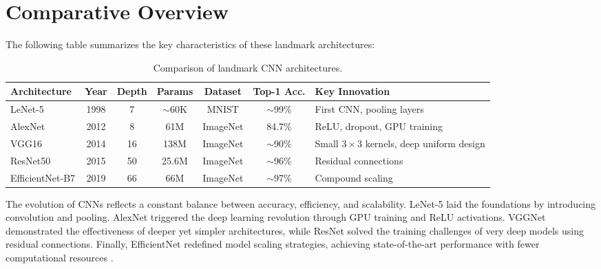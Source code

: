 \section{Comparative Overview}

The following table summarizes the key characteristics of these landmark architectures:

\begin{table}[H]
\centering
\begin{tabular}{lcccccl}
\hline
\textbf{Architecture} & \textbf{Year} & \textbf{Depth} & \textbf{Params} & \textbf{Dataset} & \textbf{Top-1 Acc.} & \textbf{Key Innovation} \\
\hline
LeNet-5 & 1998 & 7  & $\sim$60K  & MNIST    & $\sim$99\%  & First CNN, pooling layers \\
AlexNet & 2012 & 8  & 61M        & ImageNet & 84.7\%      & ReLU, dropout, GPU training \\
VGG16   & 2014 &16  & 138M       & ImageNet & $\sim$90\%  & Small $3\times3$ kernels, deep uniform design \\
ResNet50 & 2015 &50 & 25.6M      & ImageNet & $\sim$96\%  & Residual connections \\
EfficientNet-B7 & 2019 &66 & 66M & ImageNet & $\sim$97\%  & Compound scaling \\
\hline
\end{tabular}
\caption{Comparison of landmark CNN architectures.}
\label{tab:cnn_comparison}
\end{table}

The evolution of CNNs reflects a constant balance between accuracy, efficiency, and scalability.
LeNet-5 laid the foundations by introducing convolution and pooling.
AlexNet triggered the deep learning revolution through GPU training and ReLU activations.
VGGNet demonstrated the effectiveness of deeper yet simpler architectures, while ResNet solved the training challenges of very deep models using residual connections.
Finally, EfficientNet redefined model scaling strategies, achieving state-of-the-art performance with fewer computational resources \cite{li2021survey}.